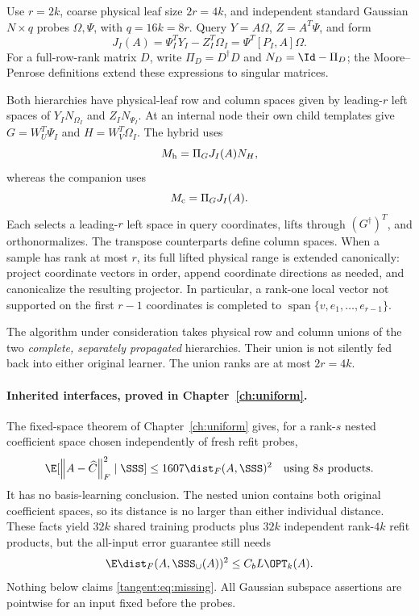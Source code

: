 \documentclass[11pt,oneside,openany,a4paper]{book}
\numberwithin{equation}{chapter}
\theoremstyle{definition}
\theoremstyle{remark}
\newcommand{\F}[1]{\left\lVert#1\right\rVert_F}
\begin{document}
Use $r=2k$, coarse physical leaf size $2r=4k$, and independent standard Gaussian $N\times q$ probes $\Omega,\Psi$, with $q=16k=8r$. Query $Y=A\Omega$, $Z=A^T\Psi$, and form
\begin{equation}\label{tangent:eq:J}
 J_I(A)=\Psi_I^TY_I-Z_I^T\Omega_I=\Psi^T[P_I,A]\Omega.
\end{equation}
For a full-row-rank matrix $D$, write $\Pi_D=D^\dagger D$ and $N_D=\Id-\Pi_D$; the Moore--Penrose definitions extend these expressions to singular matrices.

Both hierarchies have physical-leaf row and column spaces given by leading-$r$ left spaces of $Y_IN_{\Omega_I}$ and $Z_IN_{\Psi_I}$. At an internal node their own child templates give $G=W_U^T\Psi_I$ and $H=W_V^T\Omega_I$. The hybrid uses
\[
 M_{\rm h}=\Pi_GJ_I(A)N_H,
\]
whereas the companion uses
\[
 M_{\rm c}=\Pi_GJ_I(A).
\]
Each selects a leading-$r$ left space in query coordinates, lifts through $(G^\dagger)^T$, and orthonormalizes. The transpose counterparts define column spaces. When a sample has rank at most $r$, its full lifted physical range is extended canonically: project coordinate vectors in order, append coordinate directions as needed, and canonicalize the resulting projector. In particular, a rank-one local vector not supported on the first $r-1$ coordinates is completed to $\operatorname{span}\{v,e_1,\ldots,e_{r-1}\}$.

The algorithm under consideration takes physical row and column unions of the two \emph{complete, separately propagated} hierarchies. Their union is not silently fed back into either original learner. The union ranks are at most $2r=4k$.

\paragraph{Inherited interfaces, proved in Chapter~\ref{ch:uniform}.}
The fixed-space theorem of Chapter~\ref{ch:uniform} gives, for a rank-$s$ nested coefficient space chosen independently of fresh refit probes,
\begin{equation}\label{tangent:eq:refit}
 \E[\F{A-\widehat C}^2\mid\SSS]\le1607\dist_F(A,\SSS)^2
 \quad\text{using }8s\text{ products}.
\end{equation}
It has no basis-learning conclusion. The nested union contains both original coefficient spaces, so its distance is no larger than either individual distance. These facts yield $32k$ shared training products plus $32k$ independent rank-$4k$ refit products, but the all-input error guarantee still needs
\begin{equation}\label{tangent:eq:missing}
 \E\dist_F(A,\SSS_\cup(A))^2\le C_bL\OPT_k(A).
\end{equation}
Nothing below claims \eqref{tangent:eq:missing}. All Gaussian subspace assertions are pointwise for an input fixed before the probes.
\end{document}
